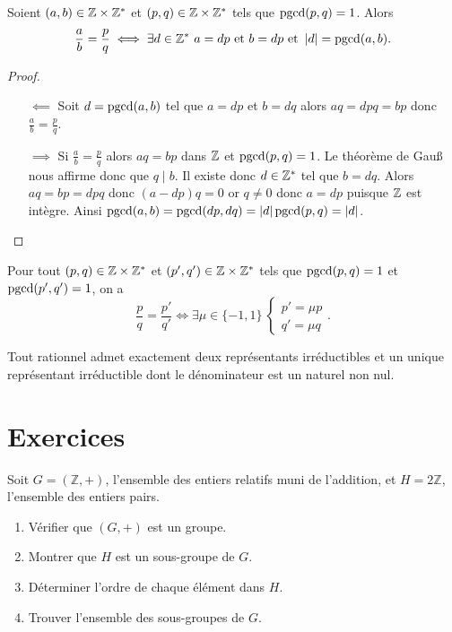 \begin{theo}
  Soient \((a,b) \in \mathbb{Z} \times \mathbb{Z}^*\) et \((p,q) \in \mathbb{Z} \times \mathbb{Z}^*\) tels que 
  \(\operatorname{pgcd}(p,q)=1\). Alors
  \begin{equation}
    \frac{a}{b} = \frac{p}{q} \iff \exists d \in \mathbb{Z}^* \ a=dp \text{~et~} b=dp 
    \text{~et~} \left\lvert d\right\rvert=\operatorname{pgcd}(a,b).
  \end{equation}
\end{theo}
\begin{proof}
  \begin{enumerate}
    \item[\(\impliedby\)] Soit \(d=\operatorname{pgcd}(a,b)\) tel que \(a=dp\) et \(b=dq\) 
      alors \(aq=dpq=bp\) donc \(\frac{a}{b} = \frac{p}{q}\).
    \item[\(\implies\)] Si \(\frac{a}{b} = \frac{p}{q}\) alors \(aq=bp\) dans 
      \(\mathbb{Z}\) et \(\operatorname{pgcd}(p,q)=1\). Le théorème de Gau\ss{} nous affirme donc que 
      \(q \mid b\). Il existe donc \(d \in \mathbb{Z}^*\) tel que \(b=dq\). Alors 
      \(aq=bp=dpq\) donc \((a-dp)q=0\) or \(q \neq 0\) donc \(a=dp\) puisque 
      \(\mathbb{Z}\) est intègre. Ainsi 
      \(\operatorname{pgcd}(a,b)=\operatorname{pgcd}(dp,dq)=\left\lvert d\right\rvert\operatorname{pgcd}(p,q)=\left\lvert d\right\rvert\).
  \end{enumerate}
\end{proof}
\begin{corth}
  Pour tout \((p,q) \in \mathbb{Z} \times \mathbb{Z}^*\) et \((p',q') \in \mathbb{Z} \times \mathbb{Z}^*\) tels 
  que \(\operatorname{pgcd}(p,q)=1\) et \(\operatorname{pgcd}(p',q')=1\), on a
  \begin{equation}
    \frac{p}{q} = \frac{p'}{q'} \iff \exists \mu \in \{-1, 1\} \
    \begin{cases}
      p'=\mu p \\
      q' =\mu q
    \end{cases}.
  \end{equation}
\end{corth}
Tout rationnel admet exactement deux représentants irréductibles et un unique 
représentant irréductible dont le dénominateur est un naturel non nul.
\section{Exercices}
\begin{exercice}
Soit \( G = (\mathbb{Z}, +) \), l'ensemble des entiers relatifs muni de l'addition, et \( H = 2\mathbb{Z} \), l'ensemble des entiers pairs.
\begin{enumerate}
    \item Vérifier que \( (G, +) \) est un groupe.
    \item Montrer que \( H \) est un sous-groupe de \( G \).
    \item Déterminer l'ordre de chaque élément dans \( H \).
    \item Trouver l'ensemble des sous-groupes de \( G \).
\end{enumerate}
\end{exercice}


